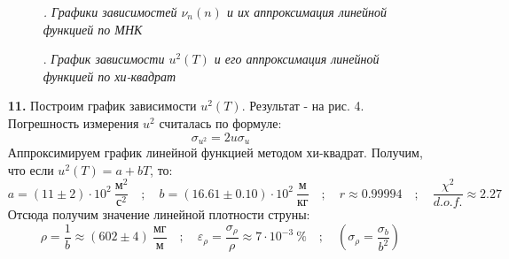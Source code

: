 \documentclass[a4paper]{article}
\begin{document}
\begin{itemize}
\begin{figure}
\caption{\textit{. Графики зависимостей $\nu_n(n)$ и их аппроксимация линейной функцией по МНК}}
\end{figure}
\begin{figure}
\caption{. \textit{График зависимости $u^2(T)$ и его аппроксимация линейной функцией по хи-квадрат}}
\end{figure}

\item[\textbf{11. }] Построим график зависимости $u^2(T)$. Результат - на рис. 4. Погрешность измерения $u^2$ считалась по формуле:
\[\sigma_{u^2} = 2 u \sigma_u \]
Аппроксимируем график линейной функцией методом хи-квадрат. Получим, что если $u^2(T) = a + bT$, то:
\[a = (11 \pm 2)\cdot 10^2 \ \frac{\text{м}^2}{\text{с}^2} \quad ; \quad b = (16.61 \pm 0.10) \cdot 10^2 \  \frac{\text{м}}{\text{кг}} \quad; \quad r \approx 0.99994 \quad; \quad \frac{\chi^2}{d.o.f.} \approx 2.27\]
Отсюда получим значение линейной плотности струны:
\[\rho = \frac{1}{b} \approx (602 \pm 4) \ \frac{\text{мг}}{\text{м}} \quad ; \quad \varepsilon_{\rho} = \frac{\sigma_{\rho}}{\rho} \approx 7 \cdot 10^{-3} \ \% \quad ; \quad \left(\sigma_{\rho} = \frac{\sigma_b}{b^2}\right)\]
\end{itemize}
\end{document}
